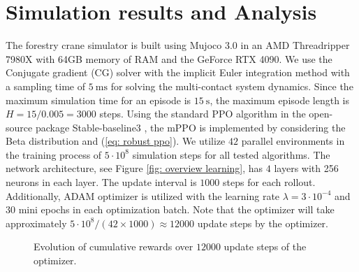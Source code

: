 
\section{Simulation results and Analysis} 
\label{Sec:exp}
The forestry crane simulator is built using Mujoco 3.0 \cite{todorov2012mujoco} in an AMD Threadripper 7980X with 64GB memory of RAM and the GeForce RTX 4090. We use the Conjugate gradient (CG) solver \cite{nazareth2009conjugate} with the implicit Euler integration method with a sampling time of $\SI{5}{\milli\second}$ for solving the multi-contact system dynamics. Since the maximum simulation time for an episode is $\SI{15}{\second}$, the maximum episode length is $H = 15/0.005 = 3000$ steps. 
Using the standard PPO algorithm in the open-source package Stable-baseline3 \cite{raffin2021stable}, the mPPO is implemented by considering the Beta distribution and (\ref{eq: robust ppo}). We utilize $42$ parallel environments in the training process of $5\cdot 10^8$ simulation steps for all tested algorithms. The network architecture, see Figure \ref{fig: overview learning}, has $4$ layers with 256 neurons in each layer. The update interval is $1000$ steps for each rollout.  Additionally, ADAM optimizer is utilized \cite{kingma2014adam} with the learning rate $\lambda = 3\cdot 10^{-4}$ and $30$ mini epochs in each optimization batch. Note that the optimizer will take approximately ${5\cdot 10^8}/(42\times1000) \approx 12000$ update steps by the optimizer. 
\begin{figure}
	\centering
	\caption{Evolution of cumulative rewards over $12000$ update steps of the optimizer.}
    \label{fig: episode reward}
\end{figure}
